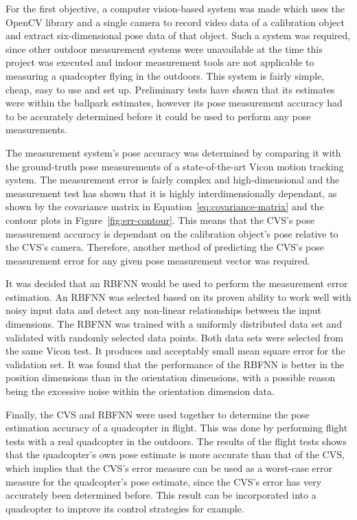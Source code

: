 For the first objective, a computer vision-based system was made which uses the OpenCV library and a single camera to record video data of a calibration object and extract six-dimensional pose data of that object. Such a system was required, since other outdoor measurement systems were unavailable at the time this project was executed and indoor measurement tools are not applicable to measuring a quadcopter flying in the outdoors. This system is fairly simple, cheap, easy to use and set up. Preliminary tests have shown that its estimates were within the ballpark estimates, however its pose measurement accuracy had to be accurately determined before it could be used to perform any pose measurements. 

The measurement system's pose accuracy was determined by comparing it with the ground-truth pose measurements of a state-of-the-art Vicon motion tracking system. The measurement error is fairly complex and high-dimensional and the measurement test has shown that it is highly interdimensionally dependant, as shown by the covariance matrix in Equation~\ref{eq:covariance-matrix} and the contour plots in Figure~\ref{fig:err-contour}. This means that the CVS's pose measurement accuracy is dependant on the calibration object's pose relative to the CVS's camera. Therefore, another method of predicting the CVS's pose measurement error for any given pose measurement vector was required.

It was decided that an RBFNN would be used to perform the measurement error estimation. An RBFNN was selected based on its proven ability to work well with noisy input data and detect any non-linear relationships between the input dimensions. The RBFNN was trained with a uniformly distributed data set and validated with randomly selected data points. Both data sets were selected from the same Vicon test. It produces and acceptably small mean square error for the validation set. It was found that the performance of the RBFNN is better in the position dimensions than in the orientation dimensions, with a possible reason being the excessive noise within the orientation dimension data. 

Finally, the CVS and RBFNN were used together to determine the pose estimation accuracy of a quadcopter in flight. This was done by performing flight tests with a real quadcopter in the outdoors. The results of the flight tests shows that the quadcopter's own pose estimate is more accurate than that of the CVS, which implies that the CVS's error measure can be used as a worst-case error measure for the quadcopter's pose estimate, since the CVS's error has very accurately been determined before. This result can be incorporated into a quadcopter to improve its control strategies for example. 

